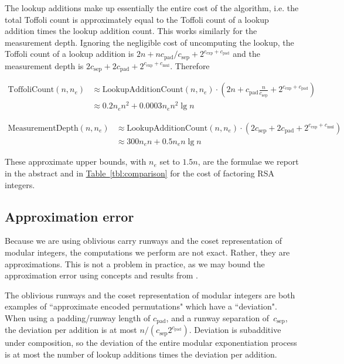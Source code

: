 \documentclass[a4paper, onecolumn, accepted=2021-03-29]{quantumarticle}
\newcommand{\tbl}[1]{\hyperref[tbl:#1]{Table~\ref*{tbl:#1}}}
\newcommand{\lenexp}{{n_e}}
\newcommand{\gexp}{{c_{\text{exp}}}}
\newcommand{\gmul}{{c_{\text{mul}}}}
\newcommand{\gsep}{{c_{\text{sep}}}}
\newcommand{\gpad}{{c_{\text{pad}}}}
\begin{document}
The lookup additions make up essentially the entire cost of the algorithm, i.e.
the total Toffoli count is approximately equal to the Toffoli count of a lookup addition times the lookup addition count.
This works similarly for the measurement depth.
Ignoring the negligible cost of uncomputing the lookup, the Toffoli count of a lookup addition is $2n + n \gpad / \gsep + 2^{\gexp + \gpad}$ and the measurement depth is $2 \gsep + 2 \gpad + 2^{\gexp + \gmul}$.
Therefore

\begin{equation}
\begin{aligned}
    \text{ToffoliCount}(n, \lenexp)
    &\approx \text{LookupAdditionCount}(n, \lenexp) \cdot \left(2n + \gpad \frac{n}{\gsep} + 2^{\gexp + \gpad} \right)
    \\&\approx 0.2 \lenexp n^2 + 0.0003 \lenexp n^2 \lg n
\end{aligned}
\end{equation}

\begin{equation}
\begin{aligned}
    \text{MeasurementDepth}(n, \lenexp)
    &\approx \text{LookupAdditionCount}(n, \lenexp) \cdot \left(2 \gsep + 2\gpad + 2^{\gexp + \gmul} \right)
    \\&\approx 300 \lenexp n + 0.5 \lenexp n \lg n
\end{aligned}
\end{equation}

These approximate upper bounds, with $\lenexp$ set to $1.5n$, are the formulae we report in the abstract and in \tbl{comparison} for the cost of factoring RSA integers.


\subsection{Approximation error}

Because we are using oblivious carry runways and the coset representation of modular integers, the computations we perform are not exact.
Rather, they are approximations.
This is not a problem in practice, as we may bound the approximation error using concepts and results from \cite{gidney2019approximatepermutation}.

The oblivious runways and the coset representation of modular integers are both examples of ``approximate encoded permutations" which have a ``deviation".
When using a padding/runway length of $\gpad$, and a runway separation of~$\gsep$, the deviation per addition is at most $n / (\gsep 2^{\gpad})$.
Deviation is subadditive under composition, so the deviation of the entire modular exponentiation process is at most the number of lookup additions times the deviation per addition.
\end{document}
